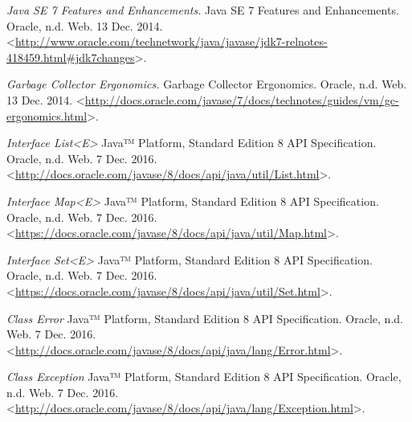 \begin{thebibliography}{9}

\textit{Java SE 7 Features and Enhancements.} Java SE 7 Features and Enhancements. Oracle, n.d. Web. 13 Dec. 2014. <\url{http://www.oracle.com/technetwork/java/javase/jdk7-relnotes-418459.html#jdk7changes}>.


\textit{Garbage Collector Ergonomics.} Garbage Collector Ergonomics. Oracle, n.d. Web. 13 Dec. 2014. <\url{http://docs.oracle.com/javase/7/docs/technotes/guides/vm/gc-ergonomics.html}>.


\textit{Interface List<E>} Java™ Platform, Standard Edition 8
API Specification. Oracle, n.d. Web. 7 Dec. 2016. <\url{http://docs.oracle.com/javase/8/docs/api/java/util/List.html}>.


\textit{Interface Map<E>} Java™ Platform, Standard Edition 8
API Specification. Oracle, n.d. Web. 7 Dec. 2016. <\url{https://docs.oracle.com/javase/8/docs/api/java/util/Map.html}>.


\textit{Interface Set<E>} Java™ Platform, Standard Edition 8
API Specification. Oracle, n.d. Web. 7 Dec. 2016. <\url{https://docs.oracle.com/javase/8/docs/api/java/util/Set.html}>.


\textit{Class Error} Java™ Platform, Standard Edition 8
API Specification. Oracle, n.d. Web. 7 Dec. 2016. <\url{http://docs.oracle.com/javase/8/docs/api/java/lang/Error.html}>.


\textit{Class Exception} Java™ Platform, Standard Edition 8
API Specification. Oracle, n.d. Web. 7 Dec. 2016. <\url{http://docs.oracle.com/javase/8/docs/api/java/lang/Exception.html}>.


\end{thebibliography}
